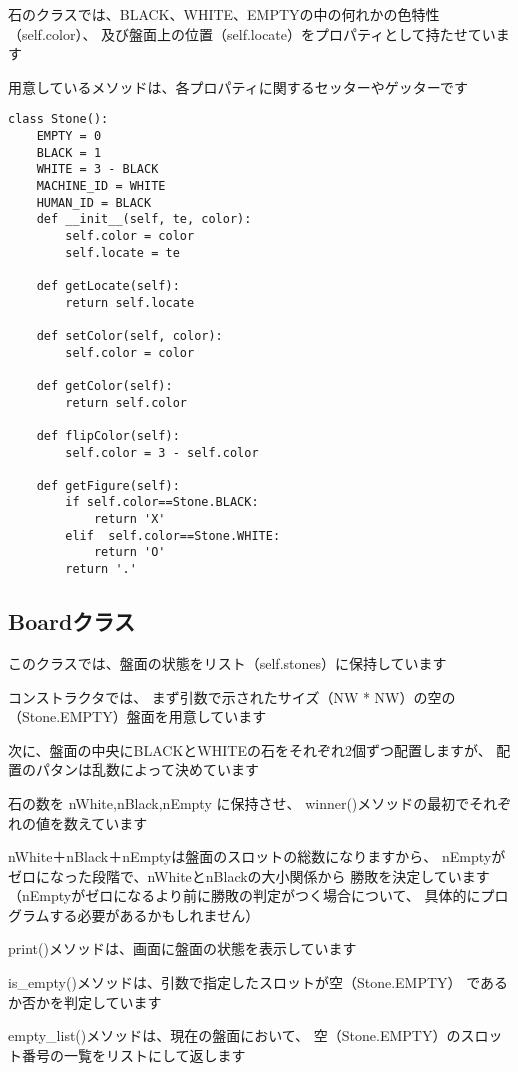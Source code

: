 \documentclass[uplatex,a4paper,11pt,oneside,openany]{jsbook}
\begin{document}
石のクラスでは、BLACK、WHITE、EMPTYの中の何れかの色特性（self.color）、
及び盤面上の位置（self.locate）をプロパティとして持たせています

用意しているメソッドは、各プロパティに関するセッターやゲッターです

\begin{lstlisting}[caption=Stone class,label=othello04]
class Stone():
    EMPTY = 0
    BLACK = 1
    WHITE = 3 - BLACK
    MACHINE_ID = WHITE
    HUMAN_ID = BLACK
    def __init__(self, te, color):
        self.color = color
        self.locate = te

    def getLocate(self):
        return self.locate

    def setColor(self, color):
        self.color = color

    def getColor(self):
        return self.color

    def flipColor(self):
        self.color = 3 - self.color

    def getFigure(self):
        if self.color==Stone.BLACK:
            return 'X'
        elif  self.color==Stone.WHITE:
            return 'O'
        return '.'
\end{lstlisting}

\subsection{Boardクラス}

このクラスでは、盤面の状態をリスト（self.stones）に保持しています

コンストラクタでは、
まず引数で示されたサイズ（NW * NW）の空の（Stone.EMPTY）盤面を用意しています

次に、盤面の中央にBLACKとWHITEの石をそれぞれ2個ずつ配置しますが、
配置のパタンは乱数によって決めています

石の数を nWhite,nBlack,nEmpty に保持させ、
winner()メソッドの最初でそれぞれの値を数えています

nWhite＋nBlack＋nEmptyは盤面のスロットの総数になりますから、
nEmptyがゼロになった段階で、nWhiteとnBlackの大小関係から
勝敗を決定しています
（nEmptyがゼロになるより前に勝敗の判定がつく場合について、
具体的にプログラムする必要があるかもしれません）

print()メソッドは、画面に盤面の状態を表示しています

is\_empty()メソッドは、引数で指定したスロットが空（Stone.EMPTY）
であるか否かを判定しています

empty\_list()メソッドは、現在の盤面において、
空（Stone.EMPTY）のスロット番号の一覧をリストにして返します
\end{document}
